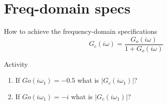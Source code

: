 \documentclass[presentation,aspectratio=169]{beamer}
\begin{document}
\section{Freq-domain specs}
\label{sec:org1202c00}
\begin{frame}[label={sec:org9c619a7}]{How to achieve the frequency-domain specifications}
\[G_c(i\omega) = \frac{ G_o(i\omega)}{1 + G_o(i\omega)}\]

\alert{Activity}
\begin{enumerate}
\item If \(Go(i\omega_1) = -0.5\) what is \(|G_c(i\omega_1)|\)?
\item If \(Go(i\omega_1) = -i\) what is \(|G_c(i\omega_1)|\)?
\end{enumerate}
\end{frame}
\end{document}
